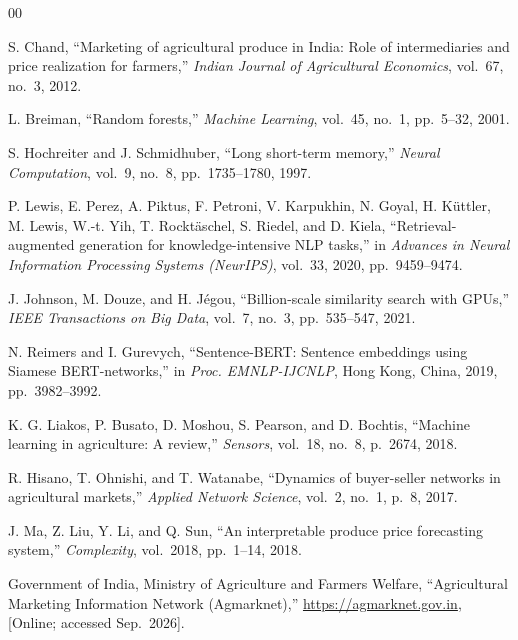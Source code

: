 \documentclass[conference]{IEEEtran}
\begin{document}
\begin{thebibliography}{00}

S. Chand,
``Marketing of agricultural produce in India: Role of intermediaries
and price realization for farmers,''
\emph{Indian Journal of Agricultural Economics},
vol.~67, no.~3, 2012.

L. Breiman,
``Random forests,''
\emph{Machine Learning},
vol.~45, no.~1, pp.~5--32, 2001.

S. Hochreiter and J. Schmidhuber,
``Long short-term memory,''
\emph{Neural Computation},
vol.~9, no.~8, pp.~1735--1780, 1997.

P. Lewis, E. Perez, A. Piktus, F. Petroni,
V. Karpukhin, N. Goyal, H. K\"{u}ttler,
M. Lewis, W.\nobreakdash-t. Yih, T. Rockt\"{a}schel,
S. Riedel, and D. Kiela,
``Retrieval-augmented generation for knowledge-intensive NLP tasks,''
in \emph{Advances in Neural Information Processing Systems (NeurIPS)},
vol.~33, 2020, pp.~9459--9474.

J. Johnson, M. Douze, and H. J\'{e}gou,
``Billion-scale similarity search with GPUs,''
\emph{IEEE Transactions on Big Data},
vol.~7, no.~3, pp.~535--547, 2021.

N. Reimers and I. Gurevych,
``Sentence-BERT: Sentence embeddings using Siamese BERT-networks,''
in \emph{Proc. EMNLP-IJCNLP},
Hong Kong, China, 2019, pp.~3982--3992.

K. G. Liakos, P. Busato, D. Moshou, S. Pearson, and D. Bochtis,
``Machine learning in agriculture: A review,''
\emph{Sensors},
vol.~18, no.~8, p.~2674, 2018.

R. Hisano, T. Ohnishi, and T. Watanabe,
``Dynamics of buyer-seller networks in agricultural markets,''
\emph{Applied Network Science},
vol.~2, no.~1, p.~8, 2017.

J. Ma, Z. Liu, Y. Li, and Q. Sun,
``An interpretable produce price forecasting system,''
\emph{Complexity},
vol.~2018, pp.~1--14, 2018.

Government of India, Ministry of Agriculture and Farmers Welfare,
``Agricultural Marketing Information Network (Agmarknet),''
\url{https://agmarknet.gov.in},
[Online; accessed Sep.\ 2026].

\end{thebibliography}

\balance
\end{document}
